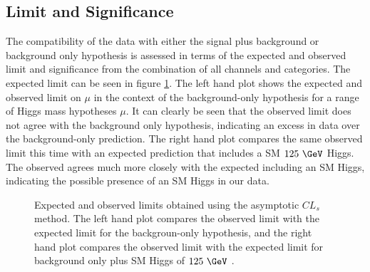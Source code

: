 \subsection{Limit and Significance}
\label{sec:significance}

The compatibility of the data with either the signal plus background or
background only hypothesis is assessed in terms of the expected and observed
limit and significance from the combination of all channels and categories. The
expected limit can be seen in figure \ref{fig:results-limit}. The left hand plot
shows the expected and observed limit on $\mu$ in the context of the
background-only hypothesis for a range of Higgs mass hypotheses $\mu$. 
It can clearly be seen that the observed limit does not agree with the background 
only hypothesis, indicating an excess in data over the background-only
prediction. The right hand plot compares the same observed limit this time with
an expected prediction that includes a \ac{SM} $125~\GeV$ Higgs. The observed
agrees much more closely with the expected including an \ac{SM} Higgs,
indicating the possible presence of an \ac{SM} Higgs in our data. 

\begin{figure}[h!]
\caption{Expected and observed limits obtained using the asymptotic $CL_{s}$
method. The left hand plot compares the observed limit with the expected limit
for the backgroun-only hypothesis, and the right hand plot compares the observed
limit with the expected limit for background only plus \ac{SM} Higgs of
$125~\GeV$ \cite{HIG-13-004}. }
\label{fig:results-limit}
\end{figure}

